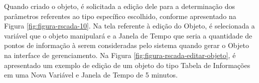 \newpage

        \begin{figure}[!h]
    	\end{figure}
    	
    	\begin{figure}[!h]
    	\end{figure}
    	
Quando criado o objeto, é solicitada a edição dele para a determinação dos parâmetros referentes ao tipo específico escolhido, conforme apresentado na Figura \ref{fig:figura-rscada-10}. Na tela referente à edição do Objeto, é selecionada a variável que o objeto manipulará e a Janela de Tempo que seria a quantidade de pontos de informação à serem consideradas pelo sistema quando gerar o Objeto na interface de gerenciamento. Na Figura \ref{fig:figura-rscada-editar-objeto}, é apresentado um exemplo de edição de um objeto do tipo Tabela de Informações em uma Nova Variável e Janela de Tempo de 5 minutos.
        
        \begin{figure}[!h]
    	\end{figure}

